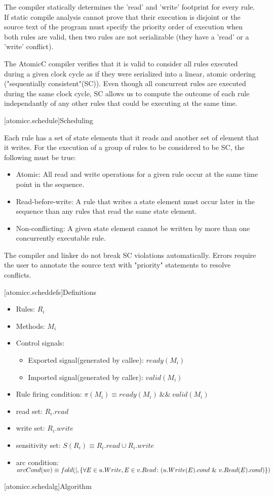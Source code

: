 The compiler statically determines the 'read' and 'write'
footprint for every rule.
If static compile analysis cannot prove that their execution is disjoint
or the source text of the program must specify the priority order of execution
when both rules are valid,
then two rules are not serializable (they have a 'read' or a 'write' conflict).

The AtomicC compiler verifies that it is valid to consider
all rules executed during a given clock cycle
as if they were serialized into a linear, atomic ordering ("sequentially consistent"(SC)).
Even though all concurrent rules are executed during the same clock cycle, SC allows us to compute the
outcome of each rule independantly of any other rules that could be executing at the same time.

[atomicc.schedule]{Scheduling}

Each rule has a set of state elements that it reads and another set of element that it writes.
For the execution of a group of rules to be considered to be SC, the following must
be true:

\begin{itemize}
\item Atomic: All read and write operations for a given rule occur at the same time point in the sequence.
\item Read-before-write:  A rule that writes a state element must occur later in the sequence
than any rules that read the same state element.
\item Non-conflicting: A given state element cannot be written by more than one concurrently executable rule.
\end{itemize}

The compiler and linker do not break SC violations automatically. Errors require the user to annotate
the source text with "priority" statements to resolve conflicts.

[atomicc.scheddefs]{Definitions}
\begin{itemize}
\item Rules: $R_{i}$
\item Methods: $M_{i}$
\item Control signals:
\begin {itemize}
\item Exported signal(generated by callee):  $ready(M_{i})$
\item Imported signal(generated by caller):  $valid(M_{i})$
\end{itemize}
\item Rule firing condition: $\pi(M_{i}) \equiv ready(M_{i})\ \&\&\ valid(M_{i})$
\item read set: $R_{i}.read$
\item write set: $R_{i}.write$
\item sensitivity set: $S(R_{i}) \equiv R_{i}.read \cup R_{i}.write$
\item arc condition: $arcCond(uv) \equiv
\newline
      fold (|, \{ \forall E \in u.Write, E \in v.Read \colon (u.Write(E).cond\ \&\ v.Read(E).cond) \})$
\end{itemize}
[atomicc.schedalg]{Algorithm}

